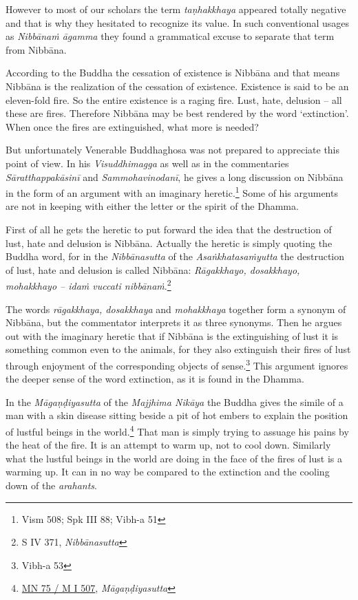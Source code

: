 However to most of our scholars the term \emph{taṇhakkhaya} appeared totally negative and that is why they hesitated to recognize its value. In such conventional usages as \emph{Nibbānaṁ āgamma} they found a grammatical excuse to separate that term from Nibbāna.

According to the Buddha the cessation of existence is Nibbāna and that means Nibbāna is the realization of the cessation of existence. Existence is said to be an eleven-fold fire. So the entire existence is a raging fire. Lust, hate, delusion -- all these are fires. Therefore Nibbāna may be best rendered by the word `extinction'. When once the fires are extinguished, what more is needed?

But unfortunately Venerable Buddhaghosa was not prepared to appreciate this point of view. In his \emph{Visuddhimagga} as well as in the commentaries \emph{Sāratthappakāsinī} and \emph{Sammohavinodanī}, he gives a long discussion on Nibbāna in the form of an argument with an imaginary heretic.\footnote{Vism 508; Spk III 88; Vibh-a 51} Some of his arguments are not in keeping with either the letter or the spirit of the Dhamma.

First of all he gets the heretic to put forward the idea that the destruction of lust, hate and delusion is Nibbāna. Actually the heretic is simply quoting the Buddha word, for in the \emph{Nibbānasutta} of the \emph{Asaṅkhatasaṁyutta} the destruction of lust, hate and delusion is called Nibbāna: \emph{Rāgakkhayo, dosakkhayo, mohakkhayo -- idaṁ vuccati nibbānaṁ}.\footnote{S IV 371, \emph{Nibbānasutta}}

The words \emph{rāgakkhaya, dosakkhaya} and \emph{mohakkhaya} together form a synonym of Nibbāna, but the commentator interprets it as three synonyms. Then he argues out with the imaginary heretic that if Nibbāna is the extinguishing of lust it is something common even to the animals, for they also extinguish their fires of lust through enjoyment of the corresponding objects of sense.\footnote{Vibh-a 53} This argument ignores the deeper sense of the word extinction, as it is found in the Dhamma.

In the \emph{Māgaṇḍiyasutta} of the \emph{Majjhima Nikāya} the Buddha gives the simile of a man with a skin disease sitting beside a pit of hot embers to explain the position of lustful beings in the world.\footnote{\href{https://suttacentral.net/mn75/pli/ms}{MN 75 / M I 507}, \emph{Māgaṇḍiyasutta}} That man is simply trying to assuage his pains by the heat of the fire. It is an attempt to warm up, not to cool down. Similarly what the lustful beings in the world are doing in the face of the fires of lust is a warming up. It can in no way be compared to the extinction and the cooling down of the \emph{arahants}.

